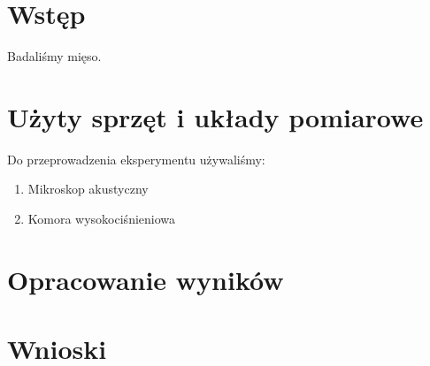 \documentclass[a4paper,12pt]{article}
\begin{document}
\section{Wstęp}

Badaliśmy mięso.


\section{Użyty sprzęt i układy pomiarowe}

Do przeprowadzenia eksperymentu używaliśmy: 

\begin{enumerate}
  \item Mikroskop akustyczny
  \item Komora wysokociśnieniowa
  
\end{enumerate}


\section{Opracowanie wyników}




\section{Wnioski}



  
\end{document}
